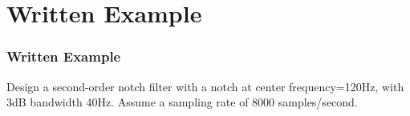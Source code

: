 \documentclass{beamer}
\begin{document}
\section[Example]{Written Example}
\setcounter{subsection}{1}
  
\begin{frame}
  \frametitle{Written Example}

  Design a second-order notch filter with a notch at center
  frequency=120Hz, with 3dB bandwidth 40Hz.  Assume a sampling rate of
  8000 samples/second.
\end{frame}
  
\end{document}
